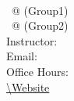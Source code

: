 \documentclass[12pt,twoside]{article}
\begin{document}
%

\begin{flushleft}
\textbf{\CourseTitle{}} \\
\DateTimeone \ @ \Roomone (Group1) \\
\DateTimetwo \ @ \Roomtwo (Group2) \\
Instructor: \InstructorName \\
Email: \Email \\
Office Hours: \OfficeHours \\
\url{\Website} \\
\end{flushleft}






\nocite{*}


\vfill
\footnotesize

\end{document}
